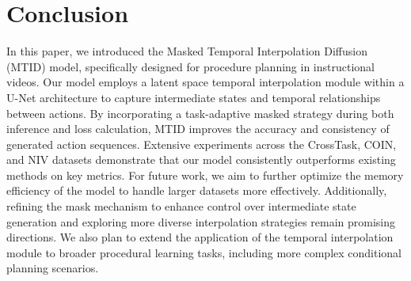 \section{Conclusion}
In this paper, we introduced the Masked Temporal Interpolation Diffusion (MTID) model, specifically designed for procedure planning in instructional videos. Our model employs a latent space temporal interpolation module within a U-Net architecture to capture intermediate states and temporal relationships between actions. By incorporating a task-adaptive masked strategy during both inference and loss calculation, MTID improves the accuracy and consistency of generated action sequences. Extensive experiments across the CrossTask, COIN, and NIV datasets demonstrate that our model consistently outperforms existing methods on key metrics.
For future work, we aim to further optimize the memory efficiency of the model to handle larger datasets more effectively. Additionally, refining the mask mechanism to enhance control over intermediate state generation and exploring more diverse interpolation strategies remain promising directions. We also plan to extend the application of the temporal interpolation module to broader procedural learning tasks, including more complex conditional planning scenarios.
